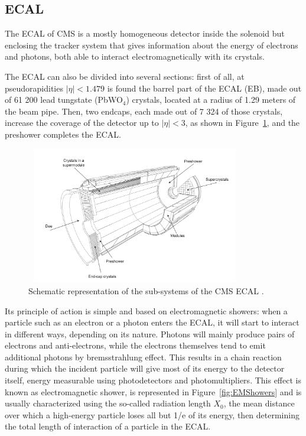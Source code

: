 \documentclass[a4paper, 10pt, openright]{report}
\begin{document}
\subsection{\acf{ECAL}} \label{subsection:ECAL}

The \ac{ECAL} of CMS is a mostly homogeneous detector inside the solenoid but enclosing the tracker system that gives information about the energy of electrons and photons, both able to interact electromagnetically with its crystals.

The \ac{ECAL} can also be divided into several sections: first of all, at pseudorapidities $|\eta| < 1.479$ is found the barrel part of the \ac{ECAL} (EB), made out of 61 200 lead tungstate (PbWO$_4$) crystals, located at a radius of 1.29 meters of the beam pipe. Then, two endcaps, each made out of 7 324 of those crystals, increase the coverage of the detector up to $|\eta| < 3$, as shown in Figure~\ref{fig:CMSECAL}, and the preshower completes the \ac{ECAL}.

\begin{figure}[htbp]
\begin{center}
\includegraphics[width=9.5cm, height=6cm]{figs/CMSEcal.png}
\caption{Schematic representation of the sub-systems of the \ac{CMS} \ac{ECAL} \cite{CMSDescription}.}
\label{fig:CMSECAL}
\end{center}
\end{figure}

Its principle of action is simple and based on electromagnetic showers: when a particle such as an electron or a photon enters the \ac{ECAL}, it will start to interact in different ways, depending on its nature. Photons will mainly produce pairs of electrons and anti-electrons, while the electrons themselves tend to emit additional photons by bremsstrahlung effect. This results in a chain reaction during which the incident particle will give most of its energy to the detector itself, energy measurable using photodetectors and photomultipliers. This effect is known as electromagnetic shower, is represented in Figure~\ref{fig:EMShowers} and is usually characterized using the so-called radiation length $X_0$, the mean distance over which a high-energy particle loses all but 1/e of its energy, then determining the total length of interaction of a particle in the \ac{ECAL}. 
\end{document}
